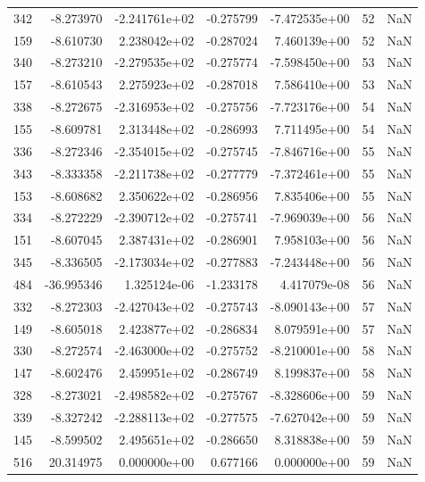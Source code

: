 \begin{tabular}{rrrrrrr}
 342 &  -8.273970 & -2.241761e+02 & -0.275799 & -7.472535e+00 &          52 & NaN \\
 159 &  -8.610730 &  2.238042e+02 & -0.287024 &  7.460139e+00 &          52 & NaN \\
 340 &  -8.273210 & -2.279535e+02 & -0.275774 & -7.598450e+00 &          53 & NaN \\
 157 &  -8.610543 &  2.275923e+02 & -0.287018 &  7.586410e+00 &          53 & NaN \\
 338 &  -8.272675 & -2.316953e+02 & -0.275756 & -7.723176e+00 &          54 & NaN \\
 155 &  -8.609781 &  2.313448e+02 & -0.286993 &  7.711495e+00 &          54 & NaN \\
 336 &  -8.272346 & -2.354015e+02 & -0.275745 & -7.846716e+00 &          55 & NaN \\
 343 &  -8.333358 & -2.211738e+02 & -0.277779 & -7.372461e+00 &          55 & NaN \\
 153 &  -8.608682 &  2.350622e+02 & -0.286956 &  7.835406e+00 &          55 & NaN \\
 334 &  -8.272229 & -2.390712e+02 & -0.275741 & -7.969039e+00 &          56 & NaN \\
 151 &  -8.607045 &  2.387431e+02 & -0.286901 &  7.958103e+00 &          56 & NaN \\
 345 &  -8.336505 & -2.173034e+02 & -0.277883 & -7.243448e+00 &          56 & NaN \\
 484 & -36.995346 &  1.325124e-06 & -1.233178 &  4.417079e-08 &          56 & NaN \\
 332 &  -8.272303 & -2.427043e+02 & -0.275743 & -8.090143e+00 &          57 & NaN \\
 149 &  -8.605018 &  2.423877e+02 & -0.286834 &  8.079591e+00 &          57 & NaN \\
 330 &  -8.272574 & -2.463000e+02 & -0.275752 & -8.210001e+00 &          58 & NaN \\
 147 &  -8.602476 &  2.459951e+02 & -0.286749 &  8.199837e+00 &          58 & NaN \\
 328 &  -8.273021 & -2.498582e+02 & -0.275767 & -8.328606e+00 &          59 & NaN \\
 339 &  -8.327242 & -2.288113e+02 & -0.277575 & -7.627042e+00 &          59 & NaN \\
 145 &  -8.599502 &  2.495651e+02 & -0.286650 &  8.318838e+00 &          59 & NaN \\
 516 &  20.314975 &  0.000000e+00 &  0.677166 &  0.000000e+00 &          59 & NaN \\

\end{tabular}
